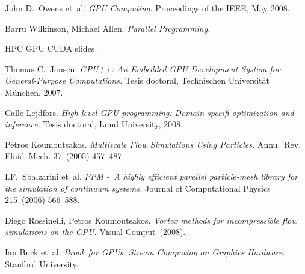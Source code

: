 \documentclass[11pt,spanish]{article}
\newcommand{\reftitle}{\textit}
\begin{document}
\begin{thebibliography}{99}
    John D.~Owens et~al.
    \reftitle{GPU Computing.}
    Proceedings of the IEEE, May 2008.

    Barru Wilkinson, Michael Allen.
    \reftitle{Parallel Programming.}

    HPC GPU CUDA slides.

    Thomas C.~Jansen.
    \reftitle{GPU++: An Embedded GPU Development System for
      General-Purpose Computations.}
    Tesis doctoral, Technischen Universität München, 2007.

    Calle Lejdfors.
    \reftitle{High-level GPU programming: Domain-specifi optimization and inference.}
    Tesis doctoral, Lund University, 2008.

    Petros Koumoutsakos.
    \reftitle{Multiscale Flow Simulations Using Particles.}
    Annu.~Rev. Fluid~Mech. 37~(2005) 457--487.

    I.F.~Sbalzarini et~al.
    \reftitle{PPM -~A highly efficient parallel particle-mesh library
      for the simulation of continuum systems.}
    Journal of Computational Physics 215~(2006) 566--588.

    Diego Rossinelli, Petros Koumoutsakos.
    \reftitle{Vortex methods for incompressible flow simulations on the GPU.}
    Visual Comput~(2008).

    Ian Buck et~al.
    \reftitle{Brook for GPUs: Stream Computing on Graphics Hardware.}
    Stanford University.

\end{thebibliography}
\end{document}

